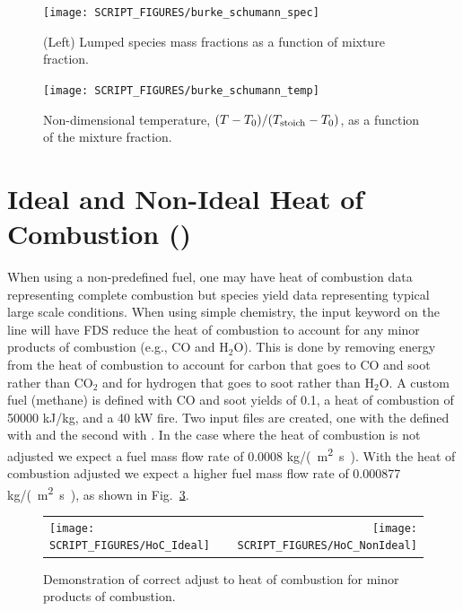 \documentclass[11pt]{book}
\begin{document}
\begin{figure}[!ht]
\centering
\texttt{[image: SCRIPT\_FIGURES/burke\_schumann\_spec]}
\caption[Mixture fraction state relations for species ()]{(Left) Lumped species mass fractions as a function of mixture fraction.}
\label{fig:burke_schumann_spec}
\end{figure}

\begin{figure}[!ht]
\centering
\texttt{[image: SCRIPT\_FIGURES/burke\_schumann\_temp]}
\caption[Mixture fraction state relations for temperature ()]{Non-dimensional temperature, $(T-T_0)/(T_{\rm stoich} - T_0)$, as a function of the mixture fraction.}
\label{fig:burke_schumann_temp}
\end{figure}



\section{Ideal and Non-Ideal Heat of Combustion ()}
\label{HoC}
\label{HoC_Ideal}
\label{HoC_NonIdeal}

When using a non-predefined fuel, one may have heat of combustion data representing complete combustion but species yield data representing typical large scale conditions.  When using simple chemistry, the input keyword  on the  line will have FDS reduce the heat of combustion to account for any minor products of combustion (e.g., CO and H$_2$O).  This is done by removing energy from the heat of combustion to account for carbon that goes to CO and soot rather than CO$_2$ and for hydrogen that goes to soot rather than H$_2$O.  A custom fuel (methane) is defined with CO and soot yields of 0.1, a heat of combustion of 50000 kJ/kg, and a 40 kW fire.  Two input files are created, one with the  defined with  and the second with .  In the  case where the heat of combustion is not adjusted we expect a fuel mass flow rate of 0.0008 \si{kg/(m^2.s)}.  With the heat of combustion adjusted we expect a higher fuel mass flow rate of 0.000877 \si{kg/(m^2.s)}, as shown in Fig.~\ref{fig:HoC}.
\begin{figure}[h!]
\begin{tabular*}{\textwidth}{lr}
\texttt{[image: SCRIPT\_FIGURES/HoC\_Ideal]} &
\texttt{[image: SCRIPT\_FIGURES/HoC\_NonIdeal]}
\end{tabular*}
\caption[ and  test cases]{Demonstration of correct adjust to heat of combustion for minor products of combustion.}
\label{fig:HoC}
\end{figure}
\end{document}
